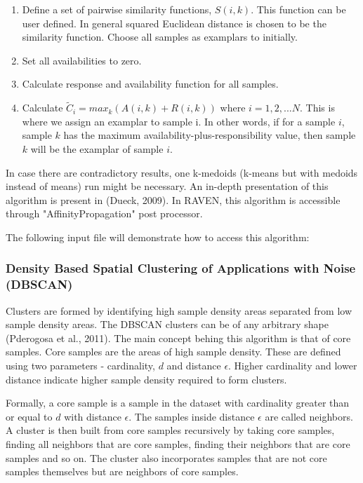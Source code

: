 \documentclass[11pt]{article}
\begin{document}
\begin{enumerate}

\item Define a set of pairwise similarity functions, $S(i, k)$. This function can be user defined. In general squared Euclidean distance is chosen to be the similarity function. Choose all samples as examplars to initially.

\item Set all availabilities to zero. 

\item Calculate response and availability function for all samples. 

\item Calculate $\tilde{C}_i = max_k\left(A(i, k) + R(i, k) \right)$ where $i = 1, 2, ... N$. This is where we assign an examplar to sample i. In other words, if for a sample $i$, sample $k$ has the maximum availability-plus-responsibility value, then sample $k$ will be the examplar of sample $i$. 

\end{enumerate}

In case there are contradictory results, one k-medoids (k-means but with medoids instead of means) run might be necessary. An in-depth presentation of this algorithm is present in (Dueck, 2009). In RAVEN, this algorithm is accessible through "AffinityPropagation" post processor. 

The following input file will demonstrate how to access this algorithm:



\subsubsection{Density Based Spatial Clustering of Applications with Noise (DBSCAN)}

Clusters are formed by identifying high sample density areas separated from low sample density areas. The DBSCAN clusters can be of any arbitrary shape (Pderogosa et al., 2011). The main concept behing this algorithm is that of core samples. Core samples are the areas of high sample density. These are defined using two parameters - cardinality, $d$ and distance $\epsilon$. Higher cardinality and lower distance indicate higher sample density required to form clusters.

Formally, a core sample is a sample in the dataset with cardinality greater than or equal to $d$ with distance $\epsilon$. The samples inside distance $\epsilon$ are called neighbors. A cluster is then built from core samples recursively by taking core samples, finding all neighbors that are core samples, finding their neighbors that are core samples and so on. The cluster also incorporates samples that are not core samples themselves but are neighbors of core samples. 
\end{document}
